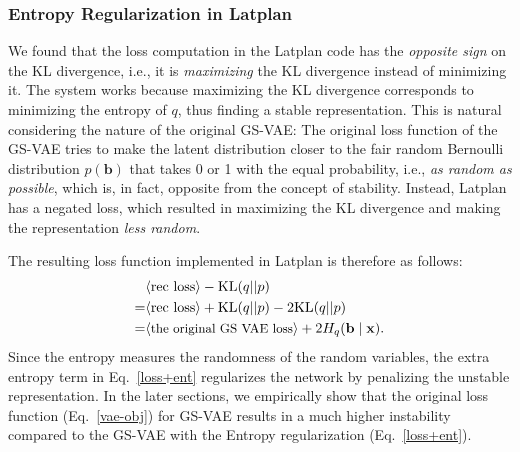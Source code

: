 \subsubsection{Entropy Regularization in Latplan}

We found that the loss computation in the Latplan code has the \emph{opposite sign} on the KL divergence,
i.e., it is \emph{maximizing} the KL divergence instead of minimizing it.
The system works
because maximizing the KL divergence corresponds to minimizing the entropy of $q$, thus finding a stable representation.
% 
This is natural considering the nature of the original GS-VAE:
The original loss function of the GS-VAE tries to make the latent distribution closer to the fair random Bernoulli distribution $p(\mathbf{b})$
that takes 0 or 1 with the equal probability, i.e., \emph{as random as possible},
which is, in fact, opposite from the concept of stability.
Instead, Latplan has a negated loss, which resulted in
maximizing the KL divergence and making the representation \emph{less random}.

The resulting loss function implemented in Latplan is therefore as follows:
{
\begin{align} 
\nonumber  &\brackets{\text{rec loss}}-{\mathrm{KL}}(q||p)                                    \\
\nonumber =&\brackets{\text{rec loss}}+{\mathrm{KL}}(q||p) - 2 {\mathrm{KL}}(q||p)          \\
\label{loss+ent} =&\brackets{\text{\small the original GS VAE loss}}      + 2 H_q(\mathbf{b} \mid \mathbf{x}).
\end{align}
}
Since the entropy measures the randomness of the random variables,
the extra entropy term in Eq.~\eqref{loss+ent} regularizes the network by penalizing the unstable representation.
% 
In the later sections, we empirically show that the original loss function (Eq.~\eqref{vae-obj}) for GS-VAE results in
a much higher instability compared to the GS-VAE with the Entropy regularization (Eq.~\eqref{loss+ent}).
% 


